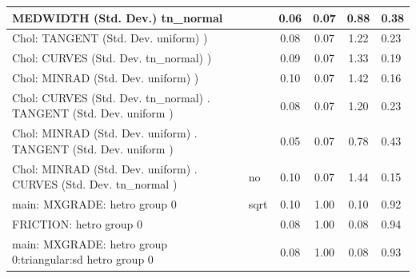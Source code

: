 \begin{table}
\begin{center}
\begin{tabular}{|l|l|c|c|c|l|}
			\hline
			MEDWIDTH (Std. Dev.) tn_normal &  & 0.06 & 0.07 & 0.88 & 0.38 \\
			\hline
			 Chol: TANGENT (Std. Dev. uniform) ) &  & 0.08 & 0.07 & 1.22 & 0.23 \\
			\hline
			 Chol: CURVES (Std. Dev. tn_normal) ) &  & 0.09 & 0.07 & 1.33 & 0.19 \\
			\hline
			 Chol: MINRAD (Std. Dev. uniform) ) &  & 0.10 & 0.07 & 1.42 & 0.16 \\
			\hline
			 Chol: CURVES (Std. Dev. tn_normal) . TANGENT (Std. Dev.   uniform ) &  & 0.08 & 0.07 & 1.20 & 0.23 \\
			\hline
			 Chol: MINRAD (Std. Dev. uniform) . TANGENT (Std. Dev.   uniform ) &  & 0.05 & 0.07 & 0.78 & 0.43 \\
			\hline
			 Chol: MINRAD (Std. Dev. uniform) . CURVES (Std. Dev.   tn_normal ) & no & 0.10 & 0.07 & 1.44 & 0.15 \\
			\hline
			main: MXGRADE: hetro group 0 & sqrt & 0.10 & 1.00 & 0.10 & 0.92 \\
			\hline
			FRICTION: hetro group 0 &  & 0.08 & 1.00 & 0.08 & 0.94 \\
			\hline
			main: MXGRADE: hetro group 0:triangular:sd  hetro group 0 &  & 0.08 & 1.00 & 0.08 & 0.93 \\
			\hline
		\end{tabular}
	\end{center}
\end{table}